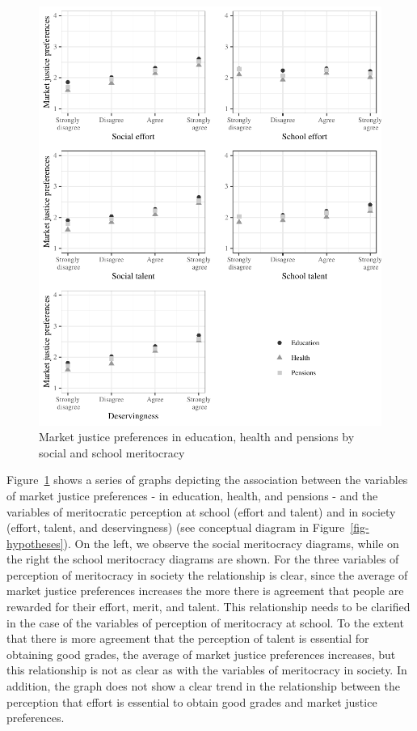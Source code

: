 \documentclass[
  letterpaper,
  DIV=11,
  numbers=noendperiod]{scrartcl}
\begin{document}
\begin{figure}

{\centering \includegraphics{paper_files/figure-pdf/fig-bivariate-1.pdf}

}

\caption{\label{fig-bivariate}Market justice preferences in education,
health and pensions by social and school meritocracy}

\end{figure}

Figure~\ref{fig-bivariate} shows a series of graphs depicting the
association between the variables of market justice preferences - in
education, health, and pensions - and the variables of meritocratic
perception at school (effort and talent) and in society (effort, talent,
and deservingness) (see conceptual diagram in
Figure~\ref{fig-hypotheses}). On the left, we observe the social
meritocracy diagrams, while on the right the school meritocracy diagrams
are shown. For the three variables of perception of meritocracy in
society the relationship is clear, since the average of market justice
preferences increases the more there is agreement that people are
rewarded for their effort, merit, and talent. This relationship needs to
be clarified in the case of the variables of perception of meritocracy
at school. To the extent that there is more agreement that the
perception of talent is essential for obtaining good grades, the average
of market justice preferences increases, but this relationship is not as
clear as with the variables of meritocracy in society. In addition, the
graph does not show a clear trend in the relationship between the
perception that effort is essential to obtain good grades and market
justice preferences.
\end{document}
